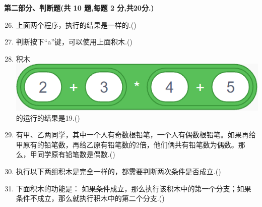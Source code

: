 \documentclass[10pt, a4paper]{article}
\begin{document}
    {\noindent\textbf{第二部分、判断题(共 10 题,每题 2 分,共20分.)}}
    \begin{enumerate}
        \setcounter{enumi}{25}
        \item 上面两个程序，执行的结果是一样的.(\qquad)

        \item 判断按下“a”键，可以使用上面积木.(\qquad)

        \item  积木\includegraphics[width=.2\textwidth]{28.png}的运行的结果是19.(\qquad)
  
        \item 有甲、乙两同学，其中一个人有奇数根铅笔，一个人有偶数根铅笔。如果再给甲原有的铅笔数，再给乙原有铅笔数的2倍，他们俩共有铅笔数为偶数。那么，甲同学原有铅笔数是偶数.(\qquad)
        
        \item 执行以下两组积木是完全一样的，都需要判断两次条件是否成立.(\qquad)
        
        \item 下面积木的功能是： 如果条件成立，那么执行该积木中的第一个分支；如果条件不成立，那么就执行积木中的第二个分支.(\qquad)
        

\end{enumerate}
\end{document}
